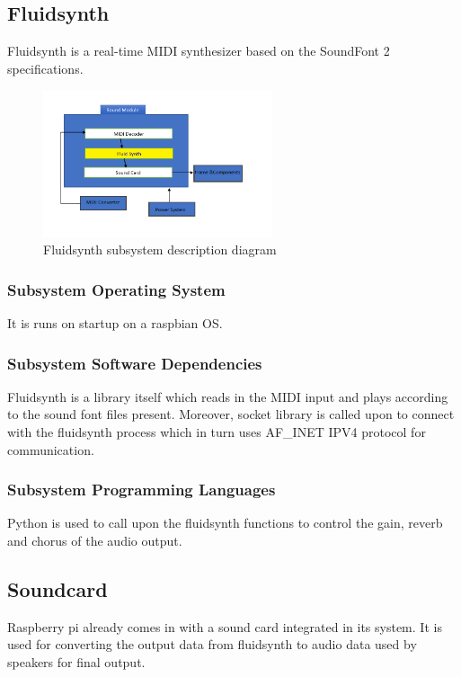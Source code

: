 \subsection{Fluidsynth}
Fluidsynth is a real-time MIDI synthesizer based on the SoundFont 2 specifications. 

\begin{figure}[h!]
	\centering
 	\includegraphics[width=0.60\textwidth]{images/fluidsynth.png}
 \caption{Fluidsynth subsystem description diagram}
\end{figure}

\subsubsection{Subsystem Operating System}
It is runs on startup on a raspbian OS.

\subsubsection{Subsystem Software Dependencies}
Fluidsynth is a library itself which reads in the MIDI input and plays according to the sound font files present. Moreover, socket library is called upon to connect with the fluidsynth process which in turn uses AF\_INET IPV4 protocol for communication.

\subsubsection{Subsystem Programming Languages}
Python is used to call upon the fluidsynth functions to control the gain, reverb and chorus of the audio output. 

\subsection{Soundcard}
Raspberry pi already comes in with a sound card integrated in its system. It is used for converting the output data from fluidsynth to audio data used by speakers for final output.


